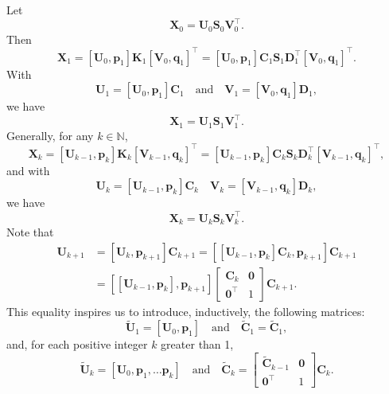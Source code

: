 \documentclass[11pt,a4paper]{article}
\newcommand{\0}{\M{0}}
\newcommand{\M}[1]{\mathbf{#1}}
\newcommand{\Mt}[1]{\tilde{\M{#1}}}
\newcommand{\N}{\mathbb{N}}
\newcommand{\T}{\top}
\newcommand{\ve}[1]{\mathbf{#1}}
\begin{document}
Let
\begin{displaymath}
  \M{X}_0 = \M{U}_0 \M{S}_0 \M{V}_0^\T.
\end{displaymath}
Then
\begin{displaymath}
  \M{X}_1 = [\M{U}_0, \ve{p}_1] \M{K}_1 [\M{V}_0, \ve{q}_1]^\T
  = [\M{U}_0, \ve{p}_1] \M{C}_1 \M{S}_1 \M{D}_1^\T [\M{V}_0, \ve{q}_1]^\T.
 \end{displaymath}
With
\begin{displaymath}
  \M{U}_1 =  [\M{U}_0, \ve{p}_1] \M{C}_1
  \quad
  \text{and}
  \quad
  \M{V}_1 = [\M{V}_0, \ve{q}_1] \M{D}_1,
\end{displaymath}
we have
\begin{displaymath}
  \M{X}_1 =   \M{U}_1 \M{S}_1 \M{V}_1^\T.
\end{displaymath}
Generally, for any $k \in \N$, 
\begin{displaymath}
  \M{X}_k = [\M{U}_{k-1}, \ve{p}_k] \M{K}_k [\M{V}_{k-1}, \ve{q}_k]^\T
  = [\M{U}_{k-1}, \ve{p}_k] \M{C}_k \M{S}_k \M{D}_k^\T [\M{V}_{k-1}, \ve{q}_k]^\T,
\end{displaymath}
and with
\begin{displaymath}
  \M{U}_k =  [\M{U}_{k-1}, \ve{p}_k] \M{C}_k
  \quad
  \M{V}_k = [\M{V}_{k-1}, \ve{q}_k] \M{D}_k,
\end{displaymath}
we have
\begin{displaymath}
  \M{X}_k =  \M{U}_k \M{S}_k \M{V}_k^\T.
\end{displaymath}
Note that
\begin{align*}
  \M{U}_{k+1}
  &
    = [\M{U}_k, \ve{p}_{k+1}] \M{C}_{k+1}
    =  [[\M{U}_{k-1}, \ve{p}_k] \M{C}_k, \ve{p}_{k+1}] \M{C}_{k+1}
  \\
  &
    =
    \left[
    [\M{U}_{k-1}, \ve{p}_k], \ve{p}_{k+1}
    \right]
    \begin{bmatrix}
      \M{C}_k & \0
      \\
      \0^\T & 1
    \end{bmatrix}
              \M{C}_{k+1}.
\end{align*}
This equality inspires us to introduce, inductively, the following matrices:
\begin{displaymath}
  \Mt{U}_1 = [\M{U}_0, \ve{p}_1]
  \quad
  \text{and}
  \quad
  \Mt{C}_1 = \Mt{C}_1,
\end{displaymath}
and, for each positive integer $k$ greater than 1, 
\begin{displaymath}
  \Mt{U}_k = [\M{U}_0, \ve{p}_1, \dots \ve{p}_k]
  \quad
  \text{and}
  \quad
  \Mt{C}_k
  =
  \begin{bmatrix}
    \Mt{C}_{k-1} & \0
    \\
    \0^\T & 1
  \end{bmatrix}
  \M{C}_k.
\end{displaymath}
\end{document}
